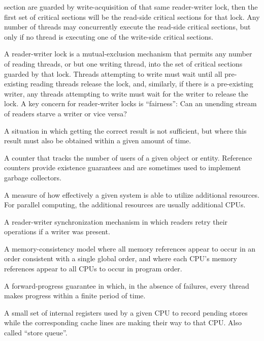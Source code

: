 \begin{description}
	section are guarded by write-acquisition of that same reader-writer
	lock, then the first set of critical sections will be the
	read-side critical sections for that lock.
	Any number of threads may concurrently execute the read-side
	critical sections, but only if no thread is executing one of
	the write-side critical sections.
\item[\IXh{Reader-Writer}{Lock}:]
	A reader-writer lock is a mutual-exclusion mechanism that
	permits any number of reading
	threads, or but one writing thread, into the set of critical
	sections guarded by that lock.
	Threads attempting to write must wait until all pre-existing
	reading threads release the lock, and, similarly, if there
	is a pre-existing writer, any threads attempting to write must
	wait for the writer to release the lock.
	A key concern for reader-writer locks is ``fairness'':
	Can an unending stream of readers starve a writer or vice versa?
\item[\IX{Real Time}:]
	A situation in which getting the correct result is not sufficient,
	but where this result must also be obtained within a given amount
	of time.
\item[\IX{Reference Count}:]
	A counter that tracks the number of users of a given object or
	entity.
	Reference counters provide existence guarantees and are sometimes
	used to implement garbage collectors.
\item[\IX{Scalability}:]
	A measure of how effectively a given system is able to utilize
	additional resources.
	For parallel computing, the additional resources are usually
	additional CPUs.
\item[\IXh{Sequence}{Lock}:]
	A reader-writer synchronization mechanism in which readers
	retry their operations if a writer was present.
\item[\IXalth{Sequential Consistency}{sequential}{memory consistency}:]
	A memory-consistency model where all memory references appear to occur
	in an order consistent with
	a single global order, and where each CPU's memory references
	appear to all CPUs to occur in program order.
\item[\IX{Starvation Free}:]
	A forward-progress guarantee in which, in the absence of
	failures, every thread makes progress within a finite
	period of time.
\item[\IX{Store Buffer}:]
	A small set of internal registers used by a given CPU
	to record pending stores
	while the corresponding cache lines are making their
	way to that CPU\@.
	Also called ``store queue''.
\item[\IX{Store Forwarding}:]

\end{description}
